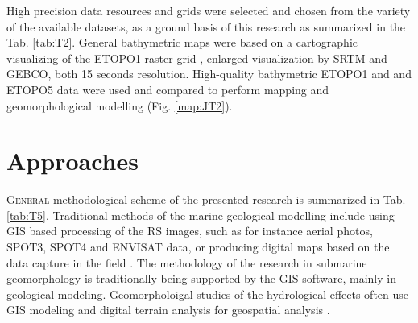\documentclass[11pt,a4paper]{report}
\begin{document}
{High precision data resources and grids were selected and chosen from the variety of the available datasets, as a ground basis of this research as summarized in the Tab. \ref{tab:T2}. General bathymetric maps were based on a cartographic visualizing of the \ac{ETOPO1} raster grid \cite{AmanteEakins2009}, enlarged visualization by \ac{SRTM} \cite{Farretal2007} and \ac{GEBCO}, both 15 seconds resolution. High-quality bathymetric \ac{ETOPO1} and and \ac{ETOPO5} data were used and compared to perform mapping and geomorphological modelling  (Fig. \ref{map:JT2}). 

\pagebreak
\section{Approaches}
\lettrine[lines=3]{\color{HotPink4}G}{eneral} methodological scheme of the presented research is summarized in Tab. \ref{tab:T5}. Traditional methods of the marine geological modelling include using \ac{GIS} based processing of the \ac{RS} images, such as for instance aerial photos, \ac{SPOT}3, \ac{SPOT}4 and \ac{ENVISAT} data, or producing digital maps based on the data capture in the field \cite{Bogdanovetal2011}. The methodology of the research in submarine geomorphology is traditionally being supported by the GIS software, mainly in geological modeling. Geomorpholoigal studies of the hydrological effects often use \ac{GIS} modeling and digital terrain analysis for geospatial analysis \cite{Berger2011}. 

}
\end{document}
